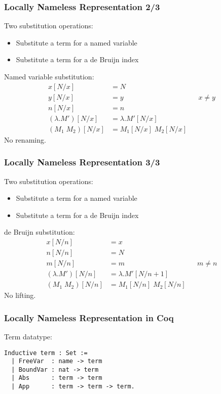 \documentclass[notheorems]{beamer}
\begin{document}
\begin{frame}

  \frametitle{Locally Nameless Representation 2/3}

  Two substitution operations:
  \begin{itemize}
  \item Substitute a term for a named variable
  \item Substitute a term for a de Bruijn index
  \end{itemize}

  Named variable substitution:
  \begin{align*}
    x[N/x]             &= N\\
    y[N/x]             &= y                 && \text{$x \neq y$} \\
    n[N/x]             &= n\\
    (\lambda .M')[N/x] &= \lambda .M'[N/x]\\
    (M_1 \; M_2)[N/x]  &= M_1[N/x] \; M_2[N/x]
  \end{align*}
  No renaming.

\end{frame}


\begin{frame}

  \frametitle{Locally Nameless Representation 3/3}

  Two substitution operations:
  \begin{itemize}
  \item Substitute a term for a named variable
  \item Substitute a term for a de Bruijn index
  \end{itemize}

  de Bruijn substitution:
  \begin{align*}
    x[N/n]             &= x\\
    n[N/n]             &= N\\
    m[N/n]             &= m                    && \text{$m \neq n$} \\
    (\lambda .M')[N/n] &= \lambda .M'[N / n\!+\!1]\\
    (M_1 \; M_2)[N/n]  &= M_1[N/n] \; M_2[N/n]
  \end{align*}
  No lifting.

\end{frame}


\begin{frame}[fragile]

  \frametitle{Locally Nameless Representation in Coq}

  Term datatype:
  \begin{lstlisting}
Inductive term : Set :=
  | FreeVar  : name -> term
  | BoundVar : nat -> term
  | Abs      : term -> term
  | App      : term -> term -> term.
  \end{lstlisting}

\end{frame}
\end{document}
